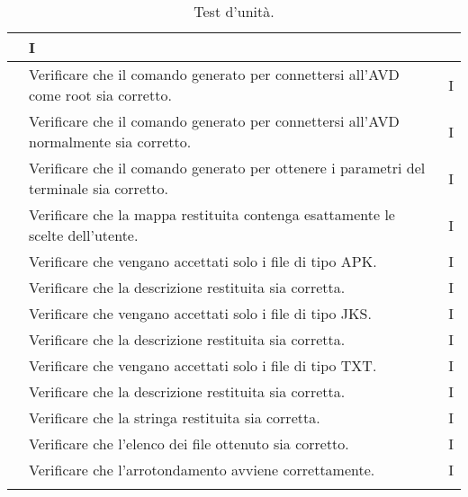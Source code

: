 \begin{longtable}{ |C{1.5cm} | C{8.5cm}| C{1.5cm} |}
    & I \\\hline
     & Verificare che il comando generato per connettersi all'AVD come root sia corretto.
    & I \\\hline
     & Verificare che il comando generato per connettersi all'AVD normalmente sia corretto.
    & I \\\hline
     & Verificare che il comando generato per ottenere i parametri del terminale sia corretto.
    & I \\\hline
     & Verificare che la mappa restituita contenga esattamente le scelte dell'utente.
    & I \\\hline
     & Verificare che vengano accettati solo i file di tipo APK.
    & I \\\hline
     & Verificare che la descrizione restituita sia corretta.
    & I \\\hline
     & Verificare che vengano accettati solo i file di tipo JKS.
    & I \\\hline
     & Verificare che la descrizione restituita sia corretta.
    & I \\\hline
     & Verificare che vengano accettati solo i file di tipo TXT.
    & I \\\hline
     & Verificare che la descrizione restituita sia corretta.
    & I \\\hline
     & Verificare che la stringa restituita sia corretta.
    & I \\\hline
     & Verificare che l'elenco dei file ottenuto sia corretto.
    & I \\\hline
     & Verificare che l'arrotondamento avviene correttamente.
    & I \\\hline
    \caption{Test d'unità.}
\end{longtable}
\setcounter{rowcount}{0}

